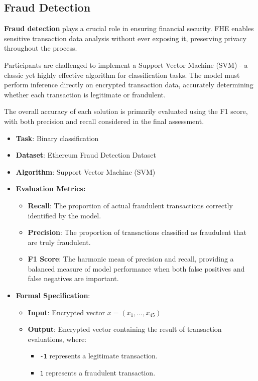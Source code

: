 \documentclass[article]{iacrtrans}
\begin{document}
\subsection{Fraud Detection}

\textbf{Fraud detection} plays a crucial role in ensuring financial security. FHE enables sensitive transaction data analysis without ever exposing it, preserving privacy throughout the process.

Participants are challenged to implement a Support Vector Machine (SVM) - a classic yet highly effective algorithm for classification tasks. The model must perform inference directly on encrypted transaction data, accurately determining whether each transaction is legitimate or fraudulent.

The overall accuracy of each solution is primarily evaluated using the F1 score, with both precision and recall considered in the final assessment.


\begin{itemize}
    \item \textbf{Task}: Binary classification
    \item \textbf{Dataset}: Ethereum Fraud Detection Dataset
    \item \textbf{Algorithm}: Support Vector Machine (SVM)
    \item \textbf{Evaluation Metrics:}
        \begin{itemize}
            \item \textbf{Recall}: The proportion of actual fraudulent transactions correctly identified by the model.
            \item \textbf{Precision}: The proportion of transactions classified as fraudulent that are truly fraudulent.
            \item \textbf{F1 Score}: The harmonic mean of precision and recall, providing a balanced measure of model performance when both false positives and false negatives are important.
        \end{itemize}
    \item \textbf{Formal Specification}: 
        \begin{itemize}
            \item \textbf{Input}: Encrypted vector $x = (x_1, ..., x_{45})$
            \item \textbf{Output}: Encrypted vector containing the result of transaction evaluations, where: 
                \begin{itemize}
                    \item \verb|-1| represents a legitimate transaction.
                    \item \verb|1| represents a fraudulent transaction.
                \end{itemize}
        \end{itemize}
\end{itemize}
\end{document}
